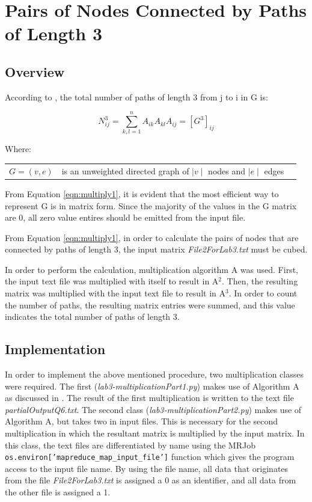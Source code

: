 \documentclass[10pt,twocolumn]{witseiepaper}
\begin{document}
\section{Pairs of Nodes Connected by Paths of Length 3}
\subsection{Overview}
According to \cite{pathLength3}, the total number of paths of length 3 from j to i in G is:

 \begin{equation}
N_{ij}^{3} = \sum _{k,l = 1}^{n} A_{ik}A_{kl}A_{ij} = [G^{3}]_{ij}
\label{eqn:multiply1}
\end{equation}

Where:
\begin{tabular}{lll}
	$G = (v,e)$           &  is an unweighted directed graph of $\mid v \mid$ nodes and $\mid e \mid$ edges \\
\end{tabular}

From Equation \ref{eqn:multiply1}, it is evident that the most efficient way to represent G is in matrix form. Since the majority of the values in the G matrix are 0, all zero value entires should be emitted from the input file.

From Equation \ref{eqn:multiply1}, in order to calculate the pairs of nodes that are connected by paths of length 3, the input matrix \textit{File2ForLab3.txt} must be cubed.

In order to perform the calculation, multiplication algorithm A was used. First, the input text file was multiplied with itself to result in A$^{2}$. Then, the resulting matrix was multiplied with the input text file to result in A$^{3}$. In order to count the number of paths, the resulting matrix entries were summed, and this value indicates the total number of paths of length 3.

\subsection{Implementation} 
In order to implement the above mentioned procedure, two multiplication classes were required. The first (\textit{lab3-multiplicationPart1.py}) makes use of Algorithm A as discussed in . The result of the first multiplication is written to the text file \textit{partialOutputQ6.txt}. The second class (\textit{lab3-multiplicationPart2.py}) makes use of Algorithm A, but takes two in input files. This is necessary for the second multiplication in which the resultant matrix is multiplied by the input matrix. In this class, the text files are differentiated by name using the MRJob \texttt{os.environ['mapreduce\_map\_input\_file']} function which gives the program access to the input file name. By using the file name, all data that originates from the file \textit{File2ForLab3.txt} is assigned a 0 as an identifier, and all data from the other file is assigned a 1.
\end{document}
